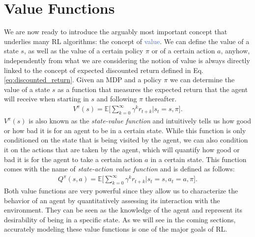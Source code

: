 \section{Value Functions}
We are now ready to introduce the arguably most important concept that underlies many RL algorithms: the concept of \textcolor{RoyalBlue}{value}. We can define the value of a state $s$, as well as the value of a certain policy $\pi$ or of a certain action $a$, anyhow, independently from what we are considering the notion of value is always directly linked to the concept of expected discounted return defined in Eq. \ref{eq:discounted_return}. Given an MDP and a policy $\pi$ we can determine the value of a state $s$ as a function that measures the expected return that the agent will receive when starting in $s$ and following $\pi$ thereafter. 
\begin{align}
    V^{\pi}(s)=\mathds{E}\bigg[\sum_{k=0}^{\infty}\gamma^{k}r_{t+k}\bigg| s_t = s, \pi \bigg].
    \label{eq:state_value_function}
\end{align}
$V^{\pi}(s)$ is also known as the \textit{state-value function} and intuitively tells us how good or how bad it is for an agent to be in a certain state. While this function is only conditioned on the state that is being visited by the agent, we can also condition it on the actions that are taken by the agent, which will quantify how good or bad it is for the agent to take a certain action $a$ in a certain state. This function comes with the name of \textit{state-action value function} and is defined as follows:
\begin{align}
     Q^{\pi}(s,a)=\mathds{E}\bigg[\sum_{k=0}^{\infty}\gamma^{k}r_{t+k} \bigg| s_t = s, a_t=a, \pi\bigg].
 \end{align}
Both value functions are very powerful since they allow us to characterize the behavior of an agent by quantitatively assessing its interaction with the environment. They can be seen as the knowledge of the agent and represent its desirability of being in a specific state. As we will see in the coming sections, accurately modeling these value functions is one of the major goals of RL.  

